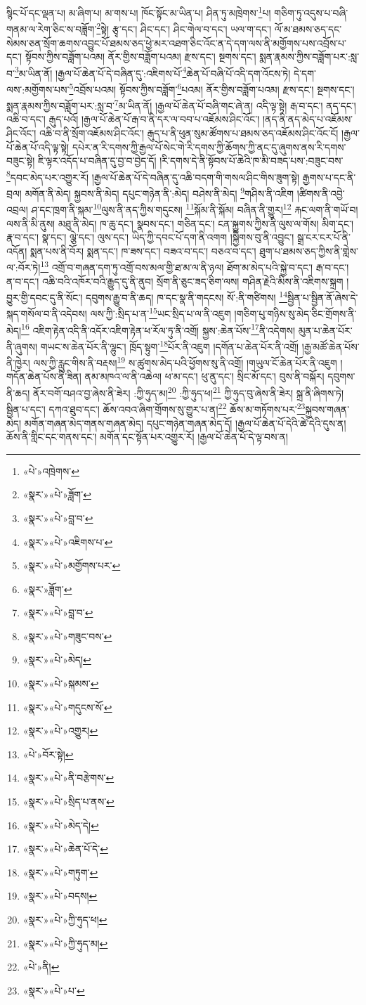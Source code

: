 སྙིང་པོ་དང་ལྡན་པ། མ་ཞིག་པ། མ་གས་པ། ཁོང་སྟོང་མ་ཡིན་པ། ཤིན་ཏུ་མཁྲེགས་\footnote{«པེ་»འཁྲེགས་}པ། གཅིག་ཏུ་འདུས་པ་བཞི་གནམ་ལ་རེག་ཅིང་ས་བཟློག་\footnote{«སྣར་»«པེ་»ཟློག་}སྟེ། རྩྭ་དང་། ཤིང་དང་། ཤིང་གེལ་བ་དང་། ཡལ་ག་དང་། ལོ་མ་ཐམས་ཅད་དང་སེམས་ཅན་སྲོག་ཆགས་འབྱུང་པོ་ཐམས་ཅད་ཕྱེ་མར་འཐག་ཅིང་འོང་ན་དེ་དག་ལས་ནི་མགྱོགས་པས་འབྲོས་པ་དང་། སྟོབས་ཀྱིས་བཟློག་པའམ། ནོར་གྱིས་བཟློག་པའམ། རྫས་དང་། སྔགས་དང་། སྨན་རྣམས་ཀྱིས་བཟློག་པར་:སླ་བ་\footnote{«སྣར་»«པེ་»བླ་བ་}མ་ཡིན་ནོ། །རྒྱལ་པོ་ཆེན་པོ་དེ་བཞིན་དུ་:འཇིགས་པོ་\footnote{«སྣར་»«པེ་»འཇིགས་པ་}ཆེན་པོ་བཞི་པོ་འདི་དག་འོངས་ཏེ། དེ་དག་ལས་:མགྱོགས་པས་\footnote{«སྣར་»«པེ་»མགྱོགས་པར་}འབྲོས་པའམ། སྟོབས་ཀྱིས་བཟློག་\footnote{«སྣར་»ཟློག་}པའམ། ནོར་གྱིས་བཟློག་པའམ། རྫས་དང་། སྔགས་དང་། སྨན་རྣམས་ཀྱིས་བཟློག་པར་:སླ་བ་\footnote{«སྣར་»«པེ་»བླ་བ་}མ་ཡིན་ནོ། །རྒྱལ་པོ་ཆེན་པོ་བཞི་གང་ཞེ་ན། འདི་ལྟ་སྟེ། རྒ་བ་དང་། ནད་དང་། འཆི་བ་དང་། རྒུད་པའོ། །རྒྱལ་པོ་ཆེན་པོ་རྒ་བ་ནི་དར་ལ་བབ་པ་འཇོམས་ཤིང་འོང་། །ནད་ནི་ནད་མེད་པ་འཇོམས་ཤིང་འོང་། འཆི་བ་ནི་སྲོག་འཇོམས་ཤིང་འོང་། རྒུད་པ་ནི་ཕུན་སུམ་ཚོགས་པ་ཐམས་ཅད་འཇོམས་ཤིང་འོང་ངོ། །རྒྱལ་པོ་ཆེན་པོ་འདི་ལྟ་སྟེ། དཔེར་ན་རི་དགས་ཀྱི་རྒྱལ་པོ་སེང་གེ་རི་དགས་ཀྱི་ཆོགས་ཀྱི་ནང་དུ་ཞུགས་ནས་རི་དགས་བཟུང་སྟེ། ཇི་ལྟར་འདོད་པ་བཞིན་དུ་བྱ་བ་བྱེད་དོ། །རི་དགས་དེ་ནི་སྟོབས་པོ་ཆེའི་ཁ་མི་བཟད་པས་:བཟུང་བས་\footnote{«སྣར་»«པེ་»གཟུང་བས་}དབང་མེད་པར་འགྱུར་རོ། །རྒྱལ་པོ་ཆེན་པོ་དེ་བཞིན་དུ་འཆི་བདག་གི་གསལ་ཤིང་གིས་ཟུག་སྟེ། རྒྱགས་པ་དང་ནི་བྲལ། མགོན་ནི་མེད། སྐྱབས་ནི་མེད། དཔུང་གཉེན་ནི་:མེད། བཤེས་ནི་མེད། \footnote{«སྣར་»«པེ་»མེད།  }གཤིས་ནི་འཇིག །ཚིགས་ནི་འབྱེ་འབྲལ། ཤ་དང་ཁྲག་ནི་སྐམ་\footnote{«སྣར་»«པེ་»སྐམས་}ལུས་ནི་ནད་ཀྱིས་གདུངས། \footnote{«སྣར་»«པེ་»གདུངས་སོ་}སྐོམ་ནི་སྐོམ། བཞིན་ནི་གྱུར།\footnote{«སྣར་»«པེ་»འགྱུར།} རྐང་ལག་ནི་གཡོ་བ། ལས་ནི་མི་ནུས། མཐུ་ནི་མེད། ཁ་ཆུ་དང་། སྣབས་དང་། གཅིན་དང་། ངན་སྐྱུགས་ཀྱིས་ནི་ལུས་ལ་གོས། མིག་དང་། རྣ་བ་དང་། སྣ་དང་། ལྕེ་དང་། ལུས་དང་། ཡིད་ཀྱི་དབང་པོ་དག་ནི་འགག །སྐྱིགས་བུ་ནི་འབྱུང་། སྒྲ་ངར་ངར་པོ་ནི་འདོན། སྨན་པས་ནི་བོར། སྨན་དང་། ཁ་ཟས་དང་། བཟའ་བ་དང་། བཅའ་བ་དང་། ཐུག་པ་ཐམས་ཅད་ཀྱིས་ནི་གླེས་ལ་:བོར་ཏེ།\footnote{«པེ་»བོར་སྟེ།} འགྲོ་བ་གཞན་དག་ཏུ་འགྲོ་བས་མལ་གྱི་ཐ་མ་ལ་ནི་ཉལ། ཐོག་མ་མེད་པའི་སྐྱེ་བ་དང་། རྒ་བ་དང་། ན་བ་དང་། འཆི་བའི་འཁོར་བའི་རྒྱུད་དུ་ནི་ནུབ། སྲོག་ནི་ཅུང་ཟད་ཅིག་ལས། གཤིན་རྗེའི་མིས་ནི་འཇིགས་སྐྲག །བྱུར་གྱི་དབང་དུ་ནི་སོང་། དབུགས་རྒྱུ་བ་ནི་ཆད། ཁ་དང་སྣ་ནི་གདངས། སོ་:ནི་གཙིགས། \footnote{«སྣར་»«པེ་»ནི་བརྩེགས་}སྦྱིན་པ་སྦྱིན་ནོ་ཞེས་དེ་སྐད་གསོལ་བ་ནི་འདེབས། ལས་ཀྱི་:སྲིད་པ་ན་\footnote{«སྣར་»«པེ་»སྲིད་པ་ནས་}ཡང་སྲིད་པ་ལ་ནི་འཇུག །གཅིག་པུ་གཉིས་སུ་མེད་ཅིང་གྲོགས་ནི་མེད།\footnote{«སྣར་»«པེ་»མེད་དེ།} འཇིག་རྟེན་འདི་ནི་འདོར་འཇིག་རྟེན་ཕ་རོལ་ཏུ་ནི་འགྲོ། སྐྱས་:ཆེན་པོས་\footnote{«སྣར་»«པེ་»ཆེན་པོ་དེ་}ནི་འདེགས། མུན་པ་ཆེན་པོར་ནི་ཞུགས། གཡང་ས་ཆེན་པོར་ནི་ལྷུང་། ཁྲོད་སྟུག་\footnote{«སྣར་»«པེ་»གཏུག་}པོར་ནི་འཇུག །དགོན་པ་ཆེན་པོར་ནི་འགྲོ། །རྒྱ་མཚོ་ཆེན་པོས་ནི་ཁྱེར། ལས་ཀྱི་རླུང་གིས་ནི་བརྡས།\footnote{«སྣར་»«པེ་»བདས།} ས་ཚུགས་མེད་པའི་ཕྱོགས་སུ་ནི་འགྲོ། །གཡུལ་ངོ་ཆེན་པོར་ནི་འཇུག །གདོན་ཆེན་པོས་ནི་ཟིན། ནམ་མཁའ་ལ་ནི་འཆེལ། ཕ་མ་དང་། ཕུ་ནུ་དང་། སྲིང་མོ་དང་། བུས་ནི་བསྐོར། དབུགས་ནི་ཆད། ནོར་བགོ་བཤའ་བྱ་ཞེས་ནི་ཟེར། :ཀྱི་ཧུད་མ།\footnote{«སྣར་»«པེ་»ཀྱི་ཧུད་ཕ།} :ཀྱི་ཧུད་ཕ།\footnote{«སྣར་»«པེ་»ཀྱི་ཧུད་མ།} ཀྱི་ཧུད་བུ་ཞེས་ནི་ཟེར། སྐྲ་ནི་ཞིགས་ཏེ། སྦྱིན་པ་དང་། དཀའ་ཐུབ་དང་། ཆོས་འབའ་ཞིག་གྲོགས་སུ་གྱུར་པ་ན།\footnote{«པེ་»ནི།} ཆོས་མ་གཏོགས་པར་\footnote{«སྣར་»«པེ་»པ་}སྐྱབས་གཞན་མེད། མགོན་གཞན་མེད་གནས་གཞན་མེད། དཔུང་གཉེན་གཞན་མེད་དོ། །རྒྱལ་པོ་ཆེན་པོ་དེའི་ཚེ་དེའི་དུས་ན། ཆོས་ནི་གླིང་དང་གནས་དང་། མགོན་དང་སྟོན་པར་འགྱུར་རོ། །རྒྱལ་པོ་ཆེན་པོ་དེ་ལྟ་བས་ན། 